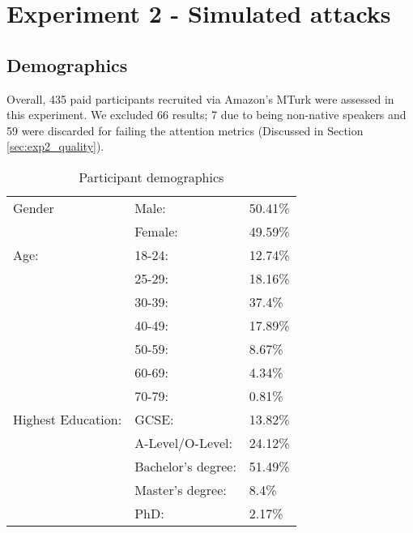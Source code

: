 

\newpage

\section{Experiment 2 - Simulated attacks}
\label{sec:exp2}

\subsection*{Demographics}
Overall, 435 paid participants recruited via Amazon's MTurk were assessed in this experiment. We excluded 66 results; 7 due to being non-native speakers and 59 were discarded for failing the attention metrics (Discussed in Section \ref{sec:exp2_quality}).

\begin{table}[h]
    \centering
    \begin{tabular}{|l|ll|}
        \hline
        Gender & Male: & 50.41\% \\
               & Female: & 49.59\% \\
        \hline
        Age:   & 18-24: & 12.74\% \\ 
               & 25-29: & 18.16\% \\ 
               & 30-39: & 37.4\% \\ 
               & 40-49: & 17.89\% \\ 
               & 50-59: & 8.67\% \\ 
               & 60-69: & 4.34\% \\ 
               & 70-79: & 0.81\% \\ 

        \hline
        Highest Education:  
        & GCSE:                 & 13.82\%  \\
        & A-Level/O-Level:      & 24.12\% \\
        & Bachelor's degree:    & 51.49\% \\
        & Master's degree:      & 8.4\% \\ 
        & PhD:                  & 2.17\% \\
        \hline

    \end{tabular}
    \caption{Participant demographics}
    \label{tab:exp2_demo}
\end{table}

